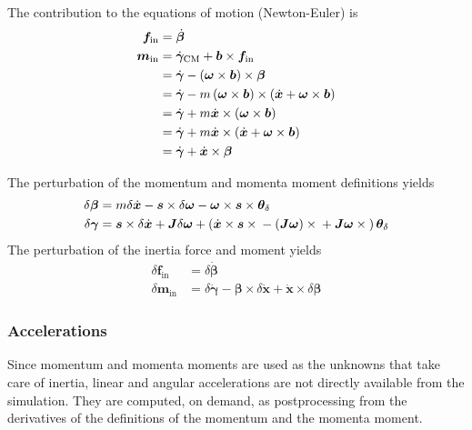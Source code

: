 \documentclass[10pt,dvips,fleqn,subeqn]{report}
\newcommand{\T}[1]{\bm{#1}}
\newcommand{\TT}[1]{\bm{#1}}
\begin{document}
The contribution to the equations of motion (Newton-Euler) is
\begin{subequations}
\label{eq:body:newton-euler}
\begin{align}
	\T{f}_{\text{in}} &= \dot{\T{\beta}}
	\label{eq:body:newton-euler:f}
	\\
	\T{m}_{\text{in}} &= \dot{\T{\gamma}}_{\text{CM}} + \T{b}\times\T{f}_{\text{in}} \nonumber \\
	&= \dot{\T{\gamma}} - \plbr{\T{\omega}\times\T{b}}\times\T{\beta} \nonumber \\
	&= \dot{\T{\gamma}} - m \plbr{\T{\omega}\times\T{b}}\times\plbr{\dot{\T{x}} + \T{\omega}\times\T{b}} \nonumber \\
	&= \dot{\T{\gamma}} + m \dot{\T{x}}\times\plbr{\T{\omega}\times\T{b}} \nonumber \\
	&= \dot{\T{\gamma}} + m \dot{\T{x}}\times\plbr{\dot{\T{x}} + \T{\omega}\times\T{b}} \nonumber \\
	&= \dot{\T{\gamma}} + \dot{\T{x}}\times\T{\beta}
	\label{eq:body:newton-euler:m}
\end{align}
\end{subequations}

The perturbation of the momentum and momenta moment definitions yields
\begin{subequations}
\label{eq:nodes:delta-beta-gamma}
\begin{align}
	\delta\T{\beta}
	&= m \delta\dot{\T{x}}
	- \T{s}\times\delta\T{\omega}
	- \T{\omega}\times\T{s}\times\T{\theta}_{\delta} \\
	\delta\T{\gamma}
	&=
	\T{s}\times\delta\dot{\T{x}}
	+ \TT{J} \delta\T{\omega}
	+ \plbr{
		\dot{\T{x}}\times\T{s}\times{}
		- \plbr{\TT{J} \T{\omega}}\times{}
		+ \TT{J} \T{\omega}\times{}
	}\T{\theta}_{\delta}
\end{align}
\end{subequations}
The perturbation of the inertia force and moment yields
\begin{subequations}
\begin{align}
	\delta\T{f}_{\text{in}}
	&= \delta\dot{\T{\beta}} \\
	\delta\T{m}_{\text{in}}
	&= \delta\dot{\T{\gamma}}
	- \T{\beta}\times\delta\dot{\T{x}}
	+ \dot{\T{x}}\times\delta\T{\beta}
\end{align}
\end{subequations}

\subsubsection{Accelerations}
\label{sec:nodes:structural nodes:dynamic structural nodes:accelerations}
Since momentum and momenta moments are used as the unknowns
that take care of inertia, linear and angular accelerations
are not directly available from the simulation.
They are computed, on demand, as postprocessing from the derivatives
of the definitions of the momentum and the momenta moment.
\end{document}
